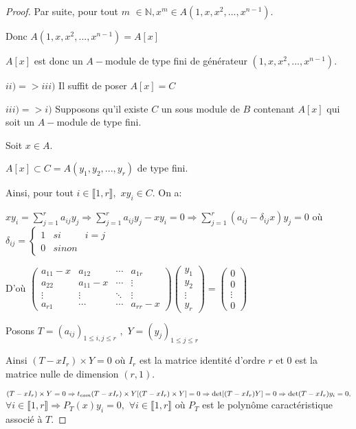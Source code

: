 \begin{proof}
	Par suite, pour tout $m$ $\in \mathbb{N},x^{m}\in A(1,x,x^{2},...,x^{n-1}).$
	
	Donc $A(1,x,x^{2},...,x^{n-1})=A[x]$
	
	$A[x]$ est donc un $A-$module de type fini de générateur $%
	(1,x,x^{2},...,x^{n-1}).$
	
	$ii)=>iii)$ Il suffit de poser $A[x]=C$
	
	$iii)=>i)$ Supposons qu'il existe $C$ un sous module de $B$ contenant $A[x]$ qui soit un $A-$module de type fini.
	
	Soit $x\in A.$
	
	$A[x]\subset C=A(y_{1},y_{2},...,y_{r})$ de type fini.
	
	Ainsi, pour tout $i\in \llbracket 1, r \rrbracket ,$ $xy_{i}\in C.$ On
	a:
	
	$xy_{i}=\sum\limits_{j=1}^{r}a_{ij}y_{j}\Rightarrow
	\sum\limits_{j=1}^{r}a_{ij}y_{j}-xy_{i}=0\Rightarrow
	\sum\limits_{j=1}^{r}(a_{ij}-\delta _{ij}x)y_{j}=0$ où $\delta_{ij}=\left\{ 
	\begin{array}{ccc}
		1 & { si } & i=j \\ 
		0 & { sinon}
	\end{array}
	\right. $
	
	D'où $\left( 
	\begin{array}{cccc}
		a_{11}-x & a_{12} & \cdots & a_{1r} \\ 
		a_{22} & a_{11}-x & \cdots& \vdots\\ 
		\vdots & \vdots& \ddots  & \vdots\\ 
		a_{r1} & \cdots & \cdots & a_{rr}-x
	\end{array}%
	\right) \left( 
	\begin{array}{c}
		y_{1} \\ 
		y_{2} \\ 
		\vdots \\ 
		y_{r}%
	\end{array}%
	\right) =\left( 
	\begin{array}{c}
		0 \\ 
		0 \\ 
		\vdots\\ 
		0%
	\end{array}%
	\right) $
	
	Posons $T=(a_{ij})_{1\leq i,j\leq r}$ $,$ $Y=(y_{j})_{1\leq j\leq r}$ 
	
	Ainsi $(T-xI_{r})\times Y=0$ où $I_{r}$ est la matrice identité d'ordre $r$ et $0$ est la matrice nulle de dimension $(r,1).$
	
	$(T-xI_{r})\times Y=0\Rightarrow {t_{com}}(T-xI_{r})\times
	Y[(T-xI_{r})\times Y]=0\\
	\Rightarrow \det [(T-xI_{r})Y]=0
	\Rightarrow \det(T-xI_{r})y_{i}=0,$ $\forall i\in \llbracket 1, r \rrbracket $$\Rightarrow P_{T}(x)y_{i}=0,$ $\forall i\in \llbracket 1, r \rrbracket
	$ où $P_{T}$ est le polynôme caractéristique associé à $T.$
	

\end{proof}
